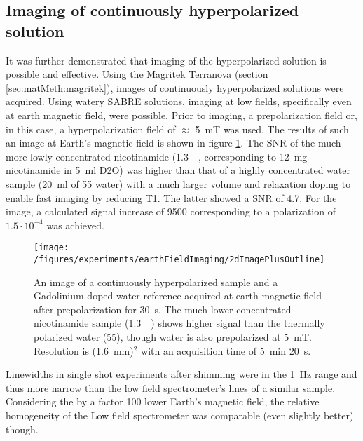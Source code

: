     \subsection{Imaging of continuously hyperpolarized solution}
    It was further demonstrated that imaging of the hyperpolarized solution is possible and effective.
    Using the Magritek Terranova (section \ref{sec:matMeth:magritek}), images of continuously hyperpolarized solutions were acquired. Using watery SABRE solutions, imaging at low fields, specifically even at earth magnetic field, were possible. Prior to imaging, a prepolarization field or, in this case, a hyperpolarization field of $\approx$ \SI{5}{\milli\tesla} was used. The results of such an image at Earth's magnetic field is shown in figure \ref{fig:results:earthFieldImage}.  The SNR of the much more lowly concentrated nicotinamide (\SI{1.3}{\milli\Molar}, corresponding to \SI{12}{\milli\gram} nicotinamide in \SI{5}{\milli\litre} D2O) was higher than that of a highly concentrated water sample (\SI{20}{\milli\litre} of \SI{55}{\Molar} water) with a much larger volume and relaxation doping to enable fast imaging by reducing T1. The latter showed a SNR of 4.7. For the image, a calculated signal increase of 9500 corresponding to a polarization of $1.5\cdot 10^{-4}$ was achieved.
    \begin{figure}
            \texttt{[image: /figures/experiments/earthFieldImaging/2dImagePlusOutline]}
            \caption[Earth field Sabre image]{An image of a continuously hyperpolarized sample and a Gadolinium doped water reference acquired at earth magnetic field after prepolarization for \SI{30}{\second}. The much lower concentrated nicotinamide sample (\SI{1.3}{\milli\Molar}) shows higher signal than the thermally polarized water (\SI{55}{\Molar}), though water is also prepolarized at \SI{5}{\milli\tesla}. Resolution is (\SI{1.6}{\milli\meter})$^2$ with an acquisition time of \SI{5}{\minute} \SI{20}{\second}.}
            \label{fig:results:earthFieldImage}
        \end{figure}
        Linewidths in single shot experiments after shimming were in the \SI{1}{\hertz} range and thus more narrow than the low field spectrometer's lines of a similar sample. Considering the by a factor 100 lower Earth's magnetic field, the relative homogeneity of the Low field spectrometer was comparable (even slightly better) though.
